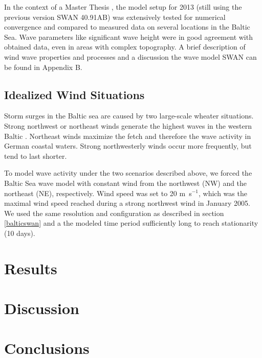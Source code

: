 In the context of a Master Thesis \citep[][]{masterarbeitronja}, the model 
setup for 2013 (still using the previous version SWAN 40.91AB) was 
extensively tested for numerical convergence and compared to measured data on 
several locations in the Baltic Sea. Wave parameters like significant wave 
height were in good agreement with obtained data, even in areas with complex 
topography. A brief description of wind wave properties and processes and a 
discussion the wave model SWAN can be found in Appendix B.

\subsection{Idealized Wind Situations}

Storm surges in the Baltic sea are caused by two large-scale wheater 
situations. Strong northwest or northeast winds generate the highest 
waves in the western Baltic \citep[][]{balticsea}. Northeast winds maximize the 
fetch and therefore the wave activity in German coastal waters. Strong 
northwesterly winds occur more frequently, but tend to last shorter. 

To model wave activity under the two scenarios described above, we forced the 
Baltic Sea wave model with constant wind from the northwest (NW) and the 
northeast (NE), respectively. Wind speed was set to 20 m~s$^{-1}$, which was 
the maximal wind speed reached during a strong northwest wind in January 2005.
We used the same resolution and configuration as described in 
section \ref{balticswan} and a the modeled time period sufficiently long to 
reach stationarity (10 days).

\section{Results}	

\section{Discussion}

\section{Conclusions}